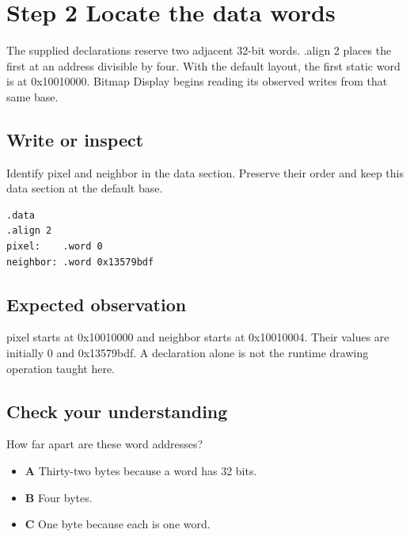 \section{Step 2 Locate the data
  words}\label{002-single-pixel-s02-step-2-locate-the-data-words}

The supplied declarations reserve two adjacent 32-bit words. .align 2
places the first at an address divisible by four. With the default
layout, the first static word is at 0x10010000. Bitmap Display begins
reading its observed writes from that same base.

\subsection{Write or
  inspect}\label{002-single-pixel-s02-write-or-inspect}

Identify pixel and neighbor in the data section. Preserve their order
and keep this data section at the default base.

\begin{verbatim}
.data
.align 2
pixel:    .word 0
neighbor: .word 0x13579bdf
\end{verbatim}

\subsection{Expected
  observation}\label{002-single-pixel-s02-expected-observation}

pixel starts at 0x10010000 and neighbor starts at 0x10010004. Their
values are initially 0 and 0x13579bdf. A declaration alone is not the
runtime drawing operation taught here.

\subsection{Check your
  understanding}\label{002-single-pixel-s02-check-your-understanding}

How far apart are these word addresses?

\begin{itemize}
  \tightlist
  \item
        \textbf{A} Thirty-two bytes because a word has 32 bits.
  \item
        \textbf{B} Four bytes.
  \item
        \textbf{C} One byte because each is one word.
\end{itemize}
